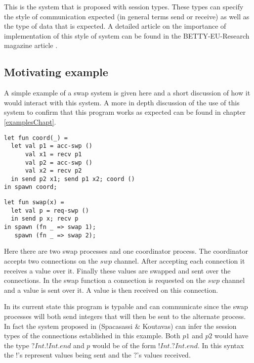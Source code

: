 This is the system that is proposed with session types. These types can specify the style of communication expected (in general terms send or receive) as well as the type of data that is expected. A detailed article on the importance of implementation of this style of system can be found in the BETTY-EU-Research magazine article \cite{ariticle}.

\subsection{Motivating example}
\label{introExample}

A simple example of a swap system is given here and a short discussion of how it would interact with this system. A more in depth discussion of the use of this system to confirm that this program works as expected can be found in chapter \ref{examplesChapt}. 

\begin{minipage}{.45\textwidth}
\begin{lstlisting}[backgroundcolor=\color{white},numbers=none]
let fun coord(_) =
  let val p1 = acc-swp ()
      val x1 = recv p1
      val p2 = acc-swp ()
      val x2 = recv p2
  in send p2 x1; send p1 x2; coord ()
in spawn coord;
\end{lstlisting}
\end{minipage}
\hfill
\begin{minipage}{.45\textwidth}
\begin{lstlisting}[backgroundcolor=\color{white},numbers=none]
let fun swap(x) =
  let val p = req-swp ()
  in send p x; recv p
in spawn (fn _ => swap 1);
   spawn (fn _ => swap 2);
\end{lstlisting}
\vspace{2em}
\end{minipage}

Here there are two swap processes and one coordinator process. The coordinator accepts two connections on the $swp$ channel. After accepting each connection it receives a value over it. Finally these values are swapped and sent over the connections. In the swap function a connection is requested on the $swp$ channel and a value is sent over it. A value is then received on this connection. 

In its current state this program is typable and can communicate since the swap processes will both send integers that will then be sent to the alternate process. In fact the system proposed in (Spacasassi \& Koutavas) \cite{paper1} can infer the session types of the connections established in this example. Both $p1$ and $p2$ would have the type $?Int.!Int.end$ and $p$ would be of the form $!Int.?Int.end$. In this syntax the $!$'s represent values being sent and the $?$'s values received. 

